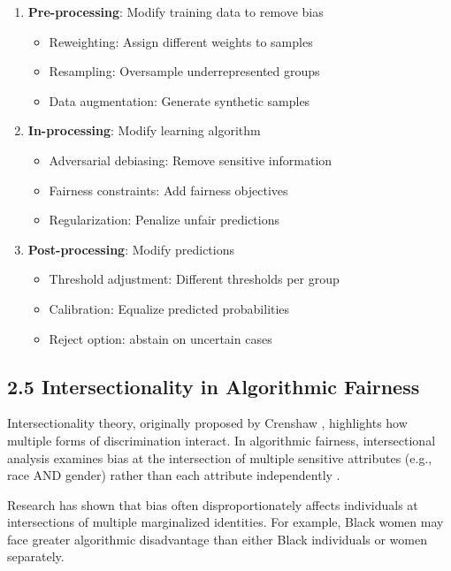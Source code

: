 \documentclass[12pt,a4paper]{article}
\begin{document}
\begin{enumerate}
    \item \textbf{Pre-processing}: Modify training data to remove bias
    \begin{itemize}
        \item Reweighting: Assign different weights to samples
        \item Resampling: Oversample underrepresented groups
        \item Data augmentation: Generate synthetic samples
    \end{itemize}
    
    \item \textbf{In-processing}: Modify learning algorithm
    \begin{itemize}
        \item Adversarial debiasing: Remove sensitive information
        \item Fairness constraints: Add fairness objectives
        \item Regularization: Penalize unfair predictions
    \end{itemize}
    
    \item \textbf{Post-processing}: Modify predictions
    \begin{itemize}
        \item Threshold adjustment: Different thresholds per group
        \item Calibration: Equalize predicted probabilities
        \item Reject option: abstain on uncertain cases
    \end{itemize}
\end{enumerate}

\subsection{2.5 Intersectionality in Algorithmic Fairness}

Intersectionality theory, originally proposed by Crenshaw \cite{crenshaw1989}, 
highlights how multiple forms of discrimination interact. In algorithmic 
fairness, intersectional analysis examines bias at the intersection of 
multiple sensitive attributes (e.g., race AND gender) rather than each 
attribute independently \cite{buolamwini2018}.

Research has shown that bias often disproportionately affects individuals 
at intersections of multiple marginalized identities. For example, Black 
women may face greater algorithmic disadvantage than either Black individuals 
or women separately.
\end{document}
